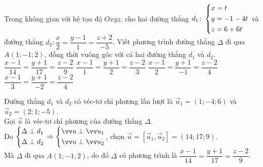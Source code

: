 \begin{ex}%
	
	
\end{ex}

\begin{ex}%
	Trong không gian với hệ tọa độ $Oxyz$, cho hai đường thẳng $d_1 \colon \left\{\begin{aligned}&x=t\\&y=-1-4t\\&z=6+6t\end{aligned}\right.$ và đường thẳng $d_2 \colon \dfrac{x}{2}=\dfrac{y-1}{1} =\dfrac{z+2}{-5}$. Viết phương trình đường thẳng $\Delta$ đi qua $A(1;-1;2)$,  đồng thời vuông góc với cả hai đường thẳng $d_1$ và $d_2$.
	\choice
	{\True $ \dfrac{x-1}{14}=\dfrac{y+1}{17}=\dfrac{z-2}{9}$}
	{$ \dfrac{x-1}{1}=\dfrac{y+1}{2}=\dfrac{z-2}{3}$}
	{$ \dfrac{x-1}{2}=\dfrac{y+1}{-1}=\dfrac{z-2}{4}$}
	{$ \dfrac{x-1}{3}=\dfrac{y+1}{-2}=\dfrac{z-2}{4}$}
	\loigiai
	{Đường thẳng $d_1$ và $d_2$ có véc-tơ chỉ phương lần lượt là $\vec{u}_1=(1;-4;6)$ và $\vec{u}_2=(2;1;-5)$.\\
		Gọi $\vec{u}$ là véc-tơ chỉ phương của đường thẳng $\Delta$.\\
		Do $\heva {&\Delta \perp d_1\\& \Delta \perp d_2} \Rightarrow \heva {&\vec{u} \perp \vec{u}_1\\& \vec{u} \perp \vec{u}_2}$, chọn $\vec{u}= \left[ \vec{u}_1, \vec{u}_2\right]= (14;17;9)$.\\
		Mà $\Delta$ đi qua $A(1;-1;2)$, do đó $\Delta$ có phương trình là $ \dfrac{x-1}{14}=\dfrac{y+1}{17}=\dfrac{z-2}{9}$.
		
	}
\end{ex}

